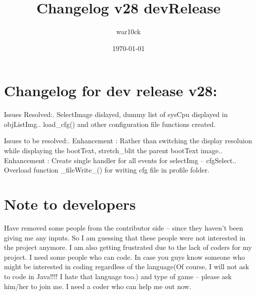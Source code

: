 \documentclass[a4paper]{article}
\begin{document}
\title{Changelog v28 devRelease}	%
\author{war10ck}	%
\date{\today}
\maketitle

\section{Changelog for dev release v28:}
Issues Resolved:. SelectImage dislayed, dummy list of sysCpu displayed in objListImg.. load\_cfg() and other configuration file functions created.\newline

Issues to be resolved:. Enhancement : Rather than switching the display resoluion while displaying the bootText, stretch\_blit the parent bootText image.. Enhancement : Create single handler for all events for selectImg -- cfgSelect.. Overload function \_fileWrite\_() for writing cfg file in profile folder.\newline

\section{Note to developers}
Have removed some people from the contributor side -- since they haven't been giving me any inputs. So I am guessing that these people were not interested in the project anymore. I am also getting frustrated due to the lack of coders for my project. I need some people who can code. In case you guys know someone who might be interested in coding regardless of the language(Of course, I will not ask to code in Java!!!! I hate that language too.) and type of game -- please ask him/her to join me. I need a coder who can help me out now.\newline

\pagebreak
\end{document}
